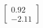 \documentclass[preview]{standalone}
\begin{document}
\begin{align*}
\begin{bmatrix} 0.92 \\ -2.11 \end{bmatrix}
\end{align*}
\end{document}
